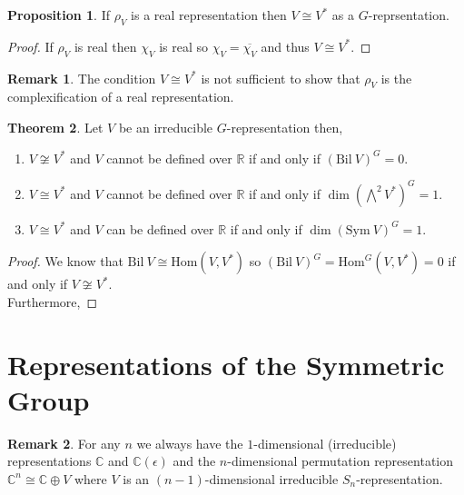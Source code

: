 \documentclass[12pt]{extarticle}
\newcommand{\C}{\mathbb{C}}
\newcommand{\R}{\mathbb{R}}
\newcommand{\Hom}[2]{\mathrm{Hom}\left( #1, #2 \right)}
\newcommand{\repHom}[3]{\mathrm{Hom}^{#1} \left( #2, #3 \right)}
\theoremstyle{definition}
\newtheorem{theorem}{Theorem}[section]
\newtheorem{proposition}[theorem]{Proposition}
\newtheorem{remark}{Remark}
\begin{document}
\begin{proposition}
If $\rho_V$ is a real representation then $V \cong V^{*}$ as a $G$-reprsentation.
\end{proposition}

\begin{proof}
If $\rho_V$ is real then $\chi_V$ is real so $\chi_V = \overline{\chi_V}$ and thus $V \cong V^*$.
\end{proof}

\begin{remark}
The condition $V \cong V^*$ is not sufficient to show that $\rho_V$ is the complexification of a real representation. 
\end{remark}

\begin{theorem}
Let $V$ be an irreducible $G$-representation then,
\begin{enumerate}
\item $V \not\cong V^*$ and $V$ cannot be defined over $\R$ if and only if $\left(\mathrm{Bil} \: V \right)^G = 0$.

\item $V \cong V^*$ and $V$ cannot be defined over $\R$ if and only if $\dim{\left(\bigwedge^2 V^* \right)^G} = 1$.

\item $V \cong V^*$ and $V$ can be defined over $\R$ if and only if $\dim{\left( \mathrm{Sym} \: V \right)^G} = 1$.
\end{enumerate}
\end{theorem}

\begin{proof}
We know that $\mathrm{Bil} \: V \cong \Hom{V}{V^*}$ so $\left( \mathrm{Bil} \: V  \right)^G = \repHom{G}{V}{V^*} = 0$ if and only if $V \not\cong V^*$. \bigskip\\
Furthermore, 
\end{proof}

\section{Representations of the Symmetric Group}

\begin{remark}
For any $n$ we always have the $1$-dimensional (irreducible) representations $\C$ and $\C(\epsilon)$ and the $n$-dimensional permutation representation $\C^n \cong \C \oplus V$ where $V$ is an $(n-1)$-dimensional irreducible $S_n$-representation. 
\end{remark}
\end{document}

